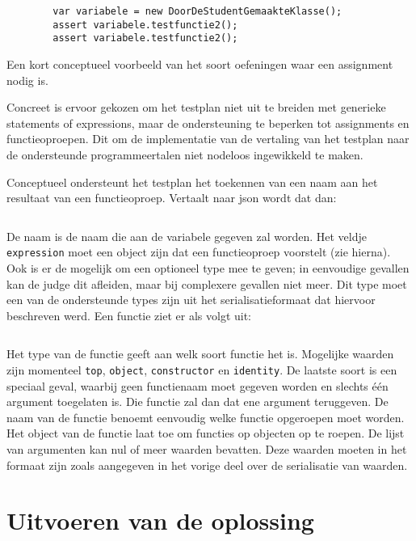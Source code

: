\begin{listing}
    \begin{verbatim}
        var variabele = new DoorDeStudentGemaakteKlasse();
        assert variabele.testfunctie2();
        assert variabele.testfunctie2();
    \end{verbatim}
    \caption{Een kort conceptueel voorbeeld van het soort oefeningen waar een assignment nodig is.}
    \label{lst:assignment-example}
\end{listing}

Concreet is ervoor gekozen om het testplan niet uit te breiden met generieke statements of expressions, maar de ondersteuning te beperken tot assignments en functieoproepen.
Dit om de implementatie van de vertaling van het testplan naar de ondersteunde programmeertalen niet nodeloos ingewikkeld te maken.

Conceptueel ondersteunt het testplan het toekennen van een naam aan het resultaat van een functieoproep.
Vertaalt naar json wordt dat dan:

\inputminted{json}{code/assignment.json}

De naam is de naam die aan de variabele gegeven zal worden.
Het veldje \texttt{expression} moet een object zijn dat een functieoproep voorstelt (zie hierna).
Ook is er de mogelijk om een optioneel type mee te geven;
in eenvoudige gevallen kan de judge dit afleiden, maar bij complexere gevallen niet meer.
Dit type moet een van de ondersteunde types zijn uit het serialisatieformaat dat hiervoor beschreven werd.
Een functie ziet er als volgt uit:

\inputminted{json}{code/function.json}

Het type van de functie geeft aan welk soort functie het is.
Mogelijke waarden zijn momenteel \texttt{top}, \texttt{object}, \texttt{constructor} en \texttt{identity}.
De laatste soort is een speciaal geval, waarbij geen functienaam moet gegeven worden en slechts één argument toegelaten is.
Die functie zal dan dat ene argument teruggeven.
De naam van de functie benoemt eenvoudig welke functie opgeroepen moet worden.
Het object van de functie laat toe om functies op objecten op te roepen.
De lijst van argumenten kan nul of meer waarden bevatten.
Deze waarden moeten in het formaat zijn zoals aangegeven in het vorige deel over de serialisatie van waarden.


\section{Uitvoeren van de oplossing}\label{sec:uitvoeren-van-de-oplossing}

